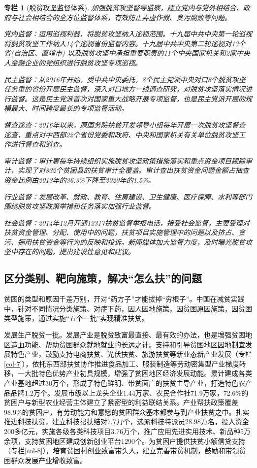 \documentclass{ctexart}
\newtheorem{zhuanlan}{专栏}
\begin{document}
\begin{zhuanlan}[脱贫攻坚监督体系]
    加强脱贫攻坚督导监察，建立党内与党外相结合、政府与社会相结合的全方位监督体系，有效防止弄虚作假、贪污腐败等问题。

    党内监督：运用巡视利器，将脱贫攻坚纳入巡视范围。十九届中共中央第一轮巡视将脱贫攻坚工作纳入14个巡视省份监督内容。十九届中共中央第二轮巡视对13个省(自治区、直辖市) 以及脱贫攻坚中承担重要职责的11个中央国家机关和2家中央人金融企业的党组织进行脱贫攻坚专项巡视。

    民主监督：从2016年开始，受中共中央委托，8个民主党派中央对口8个脱贫攻坚任务重的省份开展民主监督，深入对口地方一线调查研究，对脱贫攻坚落实情况进行监督。这是民主党派首次对国家重大战略开展专项监督，也是民主党派开展的规模最大、时间跨度最长的专项监督活动。

    督查巡查：2016年以来，原国务院扶贫开发领导小组每年开展一次脱贫攻坚督查巡查，重点对中西部22个省份党委和政府、中央和国家机关有关单位脱贫攻坚工作进行督查和巡查。

    审计监督：审计署每年持续组织实施脱贫攻坚政策措施落实和重点资金项目跟踪审计，实现了对832个贫困县的扶贫审计全覆盖。审计查出扶贫资金问题金额占抽查资金比例由2013年的36.3\%下降至2020年的1.5\%。

    行业监督：发展改革、财政、教育、住房建设、卫生健康、医疗保障、水利等部门围绕脱贫攻坚政策举措和任务落实加强行业监督。

    社会监督：2014年12月开通12317扶贫监督举报电话，接受社会监督，主要受理对扶贫资金管理、分配、使用中的问题，扶贫项目实施管理中的问题以及挤占、贪污、挪用扶贫资金等行为的反映和投诉。新闻媒体加大监督力度，及时曝光脱贫攻坚中存在的问题，提出建设性意见和建议。
    \label{col-6}
\end{zhuanlan}

\subsection{区分类别、靶向施策，解决“怎么扶”的问题}

贫困的类型和原因千差万别，开对“药方子”才能拔掉“穷根子”。中国在减贫实践中，针对不同情况分类施策、对症下药，因人因地施策，因贫困原因施策，因贫困类型施策，通过实施“五个一批”实现精准扶贫。

发展生产脱贫一批。发展产业是脱贫致富最直接、最有效的办法，也是增强贫困地区造血功能、帮助贫困群众就地就业的长远之计。支持和引导贫困地区因地制宜发展特色产业，鼓励支持电商扶贫、光伏扶贫、旅游扶贫等新业态新产业发展（专栏\ref{col-7}），依托东西部扶贫协作推进食品加工、服装制造等劳动密集型产业梯度转移，一大批特色优势产业初具规模，增强了贫困地区经济发展动能。累计建成各类产业基地超过30万个，形成了特色鲜明、带贫面广的扶贫主导产业，打造特色农产品品牌1.2万个。发展市级以上龙头企业1.44万家、农民合作社71.9万家，72.6\%的贫困户与新型农业经营主体建立了紧密型的利益联结关系。产业帮扶政策覆盖98.9\%的贫困户，有劳动能力和意愿的贫困群众基本都参与到产业扶贫之中。扎实推进科技扶贫，建立科技帮扶结对7.7万个，选派科技特派员28.98万名，投入资金200多亿元，实施各级各类科技项目3.76万个，推广应用先进实用技术、新品种5万余项，支持贫困地区建成创新创业平台1290个。为贫困户提供扶贫小额信贷支持（专栏\ref{col-8}），培育贫困村创业致富带头人，建立完善带贫机制，鼓励和带领贫困群众发展产业增收致富。
\end{document}
